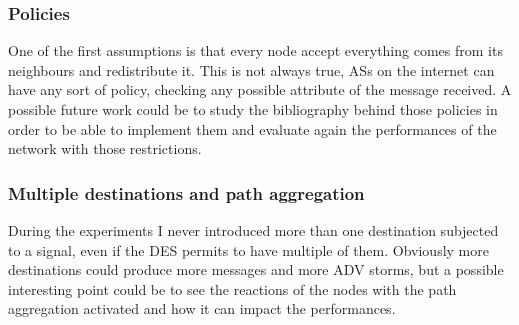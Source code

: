\subsubsection{Policies}

One of the first assumptions is that every node accept everything comes from its
neighbours and redistribute it.
This is not always true, \acp{AS} on the internet can have any sort of policy,
checking any possible attribute of the message received.
A possible future work could be to study the bibliography behind those policies
in order to be able to implement them and evaluate again the performances of
the network with those restrictions.

\subsubsection{Multiple destinations and path aggregation}

During the experiments I never introduced more than one destination subjected to a
signal, even if the \ac{DES} permits to have multiple of them.
Obviously more destinations could produce more messages and more \ac{ADV}
storms, but a possible interesting point could be to see the reactions of the nodes
with the path aggregation activated and how it can impact the performances.
